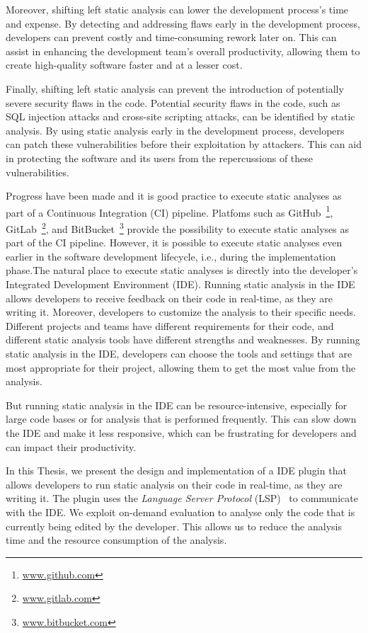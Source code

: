 Moreover, shifting left static analysis can lower the development process's
time and expense. By detecting and addressing flaws early in the development process,
developers can prevent costly and time-consuming rework later on. This can assist 
in enhancing the development team's overall productivity, allowing them to create high-quality 
software faster and at a lesser cost.

Finally, shifting left static analysis can prevent the introduction of 
potentially severe security flaws in the code. Potential security flaws in the code,
such as SQL injection attacks and cross-site scripting attacks, can be identified 
by static analysis. By using static analysis early in the development process,
developers can patch these vulnerabilities before their exploitation by attackers.
This can aid in protecting the software and its users from the repercussions of
these vulnerabilities.
 
Progress have been made and it is good practice to execute static analyses as part
of a Continuous Integration (CI) pipeline.
Platfoms such as GitHub~\footnote{\url{www.github.com}}, GitLab~\footnote{\url{www.gitlab.com}},
and BitBucket~\footnote{\url{www.bitbucket.com}} provide the possibility to execute static
analyses as part of the CI pipeline. 
However, it is possible to execute static analyses even earlier in the software development lifecycle, 
i.e., during the implementation phase.The natural place to execute static analyses is directly into 
the developer's Integrated Development Environment (IDE). 
Running static analysis in the IDE allows developers to receive feedback on their
code in real-time, as they are writing it.  Moreover, developers to customize the analysis
to their specific needs. Different projects and teams have different requirements for
their code, and different static analysis tools have different strengths and weaknesses.
By running static analysis in the IDE, developers can choose the tools and settings
that are most appropriate for their project, allowing them to get the most value
from the analysis.

But running static analysis in the IDE can be resource-intensive, especially for
large code bases or for analysis that is performed frequently. This can slow down
the IDE and make it less responsive, which can be frustrating for developers and
can impact their productivity. 

In this Thesis, we present the design and implementation of a IDE plugin that
allows developers to run static analysis on their code in real-time, as they are writing it.
The plugin uses the \emph{Language Server Protocol} (LSP)~\cite{LSP} to communicate with the IDE.
We exploit on-demand evaluation to analyse only the code that is currently being edited 
by the developer.
This allows us to reduce the analysis time and the resource consumption of the analysis.







